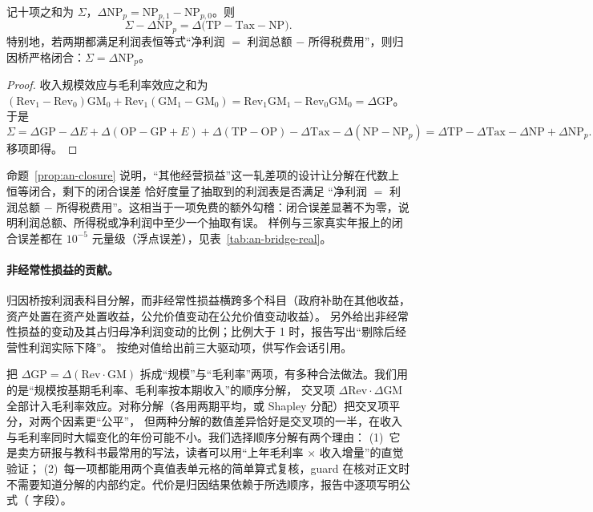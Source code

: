 \begin{proposition}[闭合误差即利润表恒等式的残差]
\label{prop:an-closure}
记十项之和为 $\Sigma$，$\Delta\text{NP}_p=\text{NP}_{p,1}-\text{NP}_{p,0}$。则
\[
\Sigma-\Delta\text{NP}_p = \Delta\big(\text{TP}-\text{Tax}-\text{NP}\big).
\]
特别地，若两期都满足利润表恒等式“净利润 $=$ 利润总额 $-$ 所得税费用”，则归因桥严格闭合：$\Sigma=\Delta\text{NP}_p$。
\end{proposition}
\begin{proof}
收入规模效应与毛利率效应之和为 $(\text{Rev}_1-\text{Rev}_0)\text{GM}_0+\text{Rev}_1(\text{GM}_1-\text{GM}_0)=\text{Rev}_1\text{GM}_1-\text{Rev}_0\text{GM}_0=\Delta\text{GP}$。于是
\[
\Sigma=\Delta\text{GP}-\Delta E+\Delta(\text{OP}-\text{GP}+E)+\Delta(\text{TP}-\text{OP})-\Delta\text{Tax}-\Delta(\text{NP}-\text{NP}_p)
=\Delta\text{TP}-\Delta\text{Tax}-\Delta\text{NP}+\Delta\text{NP}_p .
\]
移项即得。
\end{proof}

命题~\ref{prop:an-closure} 说明，“其他经营损益”这一轧差项的设计让分解在代数上恒等闭合，剩下的闭合误差  恰好度量了抽取到的利润表是否满足
“净利润 $=$ 利润总额 $-$ 所得税费用”。这相当于一项免费的额外勾稽：闭合误差显著不为零，说明利润总额、所得税或净利润中至少一个抽取有误。
样例与三家真实年报上的闭合误差都在 $10^{-5}$ 元量级（浮点误差），见表~\ref{tab:an-bridge-real}。

\paragraph{非经常性损益的贡献。}
归因桥按利润表科目分解，而非经常性损益横跨多个科目（政府补助在其他收益，资产处置在资产处置收益，公允价值变动在公允价值变动收益）。
 另外给出非经常性损益的变动及其占归母净利润变动的比例；比例大于 1 时，报告写出“剔除后经营性利润实际下降”。
 按绝对值给出前三大驱动项，供写作会话引用。

\begin{tradeoff}
把 $\Delta\text{GP}=\Delta(\text{Rev}\cdot\text{GM})$ 拆成“规模”与“毛利率”两项，有多种合法做法。我们用的是“规模按基期毛利率、毛利率按本期收入”的顺序分解，
交叉项 $\Delta\text{Rev}\cdot\Delta\text{GM}$ 全部计入毛利率效应。对称分解（各用两期平均，或 Shapley 分配）把交叉项平分，对两个因素更“公平”，
但两种分解的数值差异恰好是交叉项的一半，在收入与毛利率同时大幅变化的年份可能不小。我们选择顺序分解有两个理由：
(1)~它是卖方研报与教科书最常用的写法，读者可以用“上年毛利率 × 收入增量”的直觉验证；
(2)~每一项都能用两个真值表单元格的简单算式复核，guard 在核对正文时不需要知道分解的内部约定。代价是归因结果依赖于所选顺序，报告中逐项写明公式（ 字段）。
\end{tradeoff}

